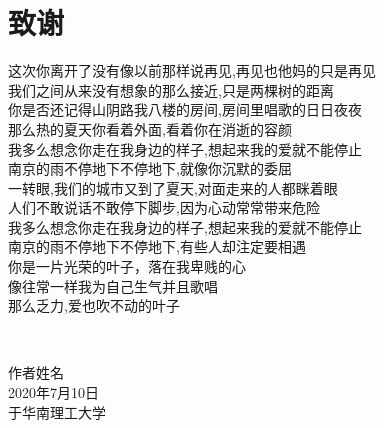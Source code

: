 \chapter{致\texorpdfstring{\quad}{}谢}
\begin{center}
这次你离开了没有像以前那样说再见,再见也他妈的只是再见 
~\\
我们之间从来没有想象的那么接近,只是两棵树的距离 
~\\
你是否还记得山阴路我八楼的房间,房间里唱歌的日日夜夜 
~\\
那么热的夏天你看着外面,看着你在消逝的容颜 
~\\
我多么想念你走在我身边的样子,想起来我的爱就不能停止 
~\\
南京的雨不停地下不停地下,就像你沉默的委屈 
~\\
一转眼,我们的城市又到了夏天,对面走来的人都眯着眼 
~\\
人们不敢说话不敢停下脚步,因为心动常常带来危险 
~\\
我多么想念你走在我身边的样子,想起来我的爱就不能停止 
~\\
南京的雨不停地下不停地下,有些人却注定要相遇 
~\\
你是一片光荣的叶子，落在我卑贱的心 
~\\
像往常一样我为自己生气并且歌唱 
~\\
那么乏力,爱也吹不动的叶子 
\end{center}

~\\

\begin{minipage}[t]{0.945\textwidth}%
	\begin{flushright}
		作者姓名\\
		2020年7月10日\\	%
		于华南理工大学
		\par\end{flushright}
\end{minipage}

